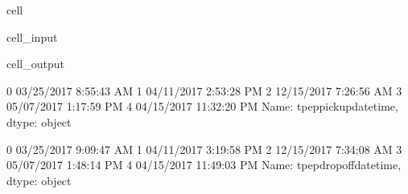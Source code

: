 \documentclass[letterpaper,10pt,english]{sphinxmanual}
\begin{document}
\begin{sphinxuseclass}{cell}
\begin{sphinxuseclass}{cell_input}
\begin{sphinxVerbatim}[commandchars=\\\{\}]
\PYG{p}{[}\PYG{p}{]}\PYG{p}{[}\PYG{p}{]}
  
\PYG{p}{[}\PYG{p}{]}\PYG{p}{[}\PYG{p}{]}
\end{sphinxVerbatim}

\end{sphinxuseclass}
\begin{sphinxuseclass}{cell_output}
\begin{sphinxVerbatim}[commandchars=\\\{\}]
0     03/25/2017 8:55:43 AM
1     04/11/2017 2:53:28 PM
2     12/15/2017 7:26:56 AM
3     05/07/2017 1:17:59 PM
4    04/15/2017 11:32:20 PM
Name: tpep\PYGZus{}pickup\PYGZus{}datetime, dtype: object

\PYGZus{}\PYGZus{}\PYGZus{}\PYGZus{}\PYGZus{}\PYGZus{}\PYGZus{}\PYGZus{}\PYGZus{}\PYGZus{}\PYGZus{}\PYGZus{}\PYGZus{}\PYGZus{}\PYGZus{}\PYGZus{}\PYGZus{}\PYGZus{}\PYGZus{}\PYGZus{}\PYGZus{}\PYGZus{}\PYGZus{}\PYGZus{}\PYGZus{}\PYGZus{}\PYGZus{}\PYGZus{}\PYGZus{}\PYGZus{}\PYGZus{}\PYGZus{}\PYGZus{}\PYGZus{}\PYGZus{}\PYGZus{}\PYGZus{}\PYGZus{}\PYGZus{}\PYGZus{}\PYGZus{}\PYGZus{}\PYGZus{}\PYGZus{}\PYGZus{}\PYGZus{}\PYGZus{}\PYGZus{}\PYGZus{}\PYGZus{}

0     03/25/2017 9:09:47 AM
1     04/11/2017 3:19:58 PM
2     12/15/2017 7:34:08 AM
3     05/07/2017 1:48:14 PM
4    04/15/2017 11:49:03 PM
Name: tpep\PYGZus{}dropoff\PYGZus{}datetime, dtype: object
\end{sphinxVerbatim}

\end{sphinxuseclass}
\end{sphinxuseclass}
\end{document}
